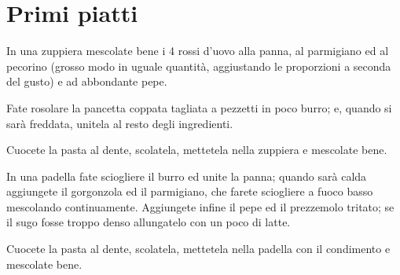 \documentclass[a4paper]{recipe}
\begin{document}
\chapter{Primi piatti}

In una zuppiera mescolate bene i 4 rossi d'uovo alla
panna, al parmigiano ed al pecorino (grosso modo in
uguale quantit\`a, aggiustando le proporzioni a seconda
del gusto) e ad abbondante pepe.

Fate rosolare la pancetta coppata tagliata a pezzetti
in poco burro; e, quando si sar\`a freddata, unitela
al resto degli ingredienti.

Cuocete la pasta al dente, scolatela, mettetela nella
zuppiera e mescolate bene.


In una padella fate sciogliere il burro ed unite la
panna; quando sar\`a calda aggiungete il gorgonzola
ed il parmigiano, che farete sciogliere a fuoco basso
mescolando continuamente.
Aggiungete infine il pepe ed il prezzemolo tritato;
se il sugo fosse troppo denso allungatelo con un poco
di latte.

Cuocete la pasta al dente, scolatela, mettetela nella
padella con il condimento e mescolate bene.
\tableofcontents
\end{document}

